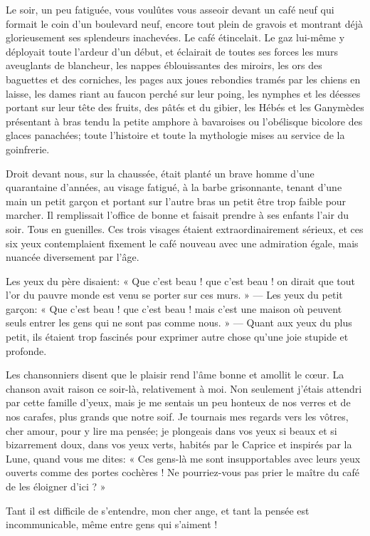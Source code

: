 Le soir, un peu fatiguée, vous voulûtes vous asseoir devant un café neuf
qui formait le coin d’un boulevard neuf, encore tout
plein de gravois et montrant déjà glorieusement ses splendeurs
inachevées. Le café étincelait. Le gaz lui{}-même y déployait toute
l’ardeur d’un début, et éclairait de
toutes ses forces les murs aveuglants de blancheur, les nappes
éblouissantes des miroirs, les ors des baguettes et des corniches, les
pages aux joues rebondies tramés par les chiens en laisse, les dames
riant au faucon perché sur leur poing, les nymphes et les déesses
portant sur leur tête des fruits, des pâtés et du gibier, les Hébés et
les Ganymèdes présentant à bras tendu la petite amphore à bavaroises ou
l’obélisque bicolore des glaces panachées; toute
l’histoire et toute la mythologie mises au service de
la goinfrerie.

Droit devant nous, sur la chaussée, était planté un brave homme
d’une quarantaine d’années, au visage
fatigué, à la barbe grisonnante, tenant d’une main un
petit garçon et portant sur l’autre bras un petit être
trop faible pour marcher. Il remplissait l’office de
bonne et faisait prendre à ses enfants l’air du soir.
Tous en guenilles. Ces trois visages étaient extraordinairement
sérieux, et ces six yeux contemplaient fixement le café nouveau avec
une admiration égale, mais nuancée diversement par
l’âge.

Les yeux du père disaient: « Que c’est beau ! que
c’est beau ! on dirait que tout l’or
du pauvre monde est venu se porter sur ces murs. » --- Les yeux du petit
garçon: « Que c’est beau ! que c’est
beau ! mais c’est une maison où peuvent seuls entrer
les gens qui ne sont pas comme nous. » --- Quant aux yeux du plus petit, 
ils étaient trop fascinés pour exprimer autre chose 
qu’une joie stupide et profonde.

Les chansonniers disent que le plaisir rend l’âme bonne
et amollit le c\oe ur. La chanson avait raison ce soir{}-là, relativement
à moi. Non seulement j’étais attendri par cette
famille d’yeux, mais je me sentais un peu honteux de
nos verres et de nos carafes, plus grands que notre soif. Je tournais
mes regards vers les vôtres, cher amour, pour y lire ma pensée; je
plongeais dans vos yeux si beaux et si bizarrement doux, dans vos yeux
verts, habités par le Caprice et inspirés par la Lune, quand vous me
dites: « Ces gens{}-là me sont insupportables avec leurs yeux ouverts
comme des portes cochères ! Ne pourriez{}-vous pas prier le maître du
café de les éloigner d’ici ? »

Tant il est difficile de s’entendre, mon cher ange, et
tant la pensée est incommunicable, même entre gens qui
s’aiment !

